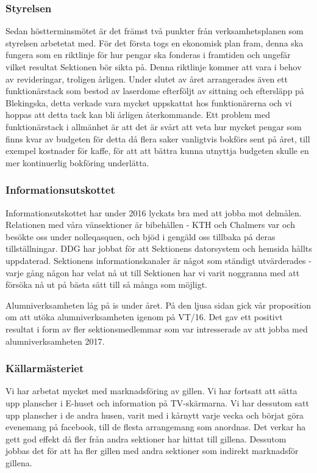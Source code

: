 \documentclass[../_main/handlingar.tex]{subfiles}
\begin{document}

\subsubsection*{Styrelsen}
Sedan höstterminsmötet är det främst två punkter från verksamhetsplanen som styrelsen arbetetat med. För det första togs en ekonomisk plan fram, denna ska fungera som en riktlinje för hur pengar ska fonderas i framtiden och ungefär vilket resultat Sektionen bör sikta på. Denna riktlinje kommer att vara i behov av revideringar, troligen årligen. Under slutet av året arrangerades även ett funktionärstack som bestod av laserdome efterföljt av sittning och eftersläpp på Blekingska, detta verkade vara mycket uppskattat hos funktionärerna och vi hoppas att detta tack kan bli årligen återkommande. Ett problem med funktionärstack i allmänhet är att det är svårt att veta hur mycket pengar som finns kvar av budgeten för detta då flera saker vanligtvis bokförs sent på året, till exempel kostnader för kaffe, för att att bättra kunna utnyttja budgeten skulle en mer kontinuerlig bokföring underlätta.

\subsubsection*{Informationsutskottet}
Informationsutskottet har under 2016 lyckats bra med att jobba mot delmålen. Relationen med våra vänsektioner är bibehållen - KTH och Chalmers var och besökte oss under nolleqasquen, och bjöd i gengäld oss tillbaka på deras tillställningar. DDG har jobbat för att Sektionens datorsystem och hemsida hållts uppdaterad. Sektionens informationskanaler är något som ständigt utvärderades - varje gång någon har velat nå ut till Sektionen har vi varit noggranna med att försöka nå ut på bästa sätt till så många som möjligt.

Alumniverksamheten låg på is under året. På den ljusa sidan gick vår proposition om att utöka alumniverksamheten igenom på VT/16. Det gav ett positivt resultat i form av fler sektionsmedlemmar som var intresserade av att jobba med alumniverksamheten 2017.

\subsubsection*{Källarmästeriet}
Vi har arbetat mycket med marknadsföring av gillen. Vi har fortsatt att sätta upp planscher i E-huset och information på TV-skärmarna. Vi har dessutom satt upp planscher i de andra husen, varit med i kårnytt varje vecka och börjat göra evenemang på facebook, till de flesta arrangemang som anordnas. Det verkar ha gett god effekt då fler från andra sektioner har hittat till gillena. Dessutom jobbas det för att ha fler gillen med andra sektioner som indirekt marknadsför gillena.
\end{document}
